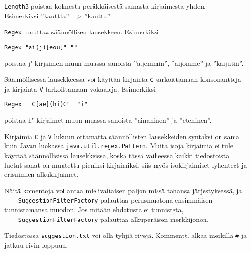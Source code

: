 \documentclass[12pt,a4paper]{scrartcl}
\begin{document}
\bigskip
\verb|Length3| poistaa kolmesta peräkkäisestä samasta kirjaimesta
yhden. \\ Esimerkiksi ''kauttta'' => ''kautta''.


\bigskip
\verb|Regex| muuttaa säännöllisen lausekkeen. Esimerkiksi

\verb|Regex "ai(j)[eou]" ""|

poistaa j"-kirjaimen muun muassa sanoista ''aijemmin'', ''aijomme'' ja
''kaijutin''.


Säännöllisessä lausekkeessa voi käyttää kirjainta \verb|C|
tarkoittamaan konsonantteja ja kirjainta \verb|V| tarkoittamaan
vokaaleja. Esimerkiksi

\verb|Regex  "C[ae](hi)C"  "i"|

poistaa h"-kirjaimet muun muassa sanoista ''ainahinen'' ja
''etehinen''.

Kirjaimia \verb|C| ja \verb|V| lukuun ottamatta säännöllisten
lausekkeiden syntaksi on sama kuin Javan luokassa
\verb=java.util.regex.Pattern=. Muita isoja kirjaimia ei tule
käyttää säännöllisissä lausekkeissa, koska tässä vaiheessa kaikki
tiedostoista luetut sanat on muutettu pieniksi kirjaimiksi, siis myös
isokirjaimiset lyhenteet ja erisnimien alkukirjaimet.

\bigskip
Näitä komentoja voi antaa mielivaltaisen paljon missä tahansa
järjestyksessä, ja \\ \verb|____SuggestionFilterFactory| palauttaa
perusmuotona ensimmäisen tunnistamansa muodon. Jos mitään ehdotusta ei
tunnisteta, \verb|____SuggestionFilterFactory| palauttaa alkuperäisen
merkkijonon.

Tiedostossa \verb|suggestion.txt| voi olla tyhjiä rivejä. Kommentti
alkaa merkillä \verb|#| ja jatkuu rivin loppuun.
\end{document}
